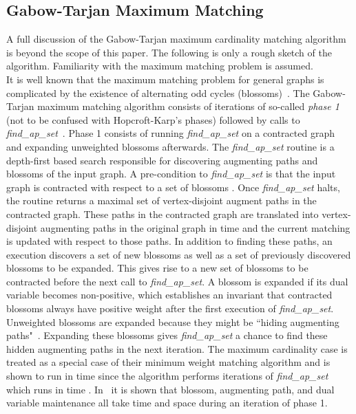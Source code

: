 \documentclass{llncs}
\begin{document}
\subsection{Gabow-Tarjan Maximum Matching}

A full discussion of the Gabow-Tarjan maximum cardinality matching algorithm~\cite{GabowT91} is beyond the scope of this paper.  The following is only a rough sketch of the algorithm.  Familiarity with the maximum matching problem is assumed.\\

\noindent It is well known that the maximum matching problem for general graphs is complicated by the existence of alternating odd cycles (blossoms)~\cite{Edmonds65}.  
The Gabow-Tarjan maximum matching algorithm consists of  iterations of so-called \emph{phase 1} (not to be confused with Hopcroft-Karp's phases) followed by  calls to \emph{find\_ap\_set}~\cite{GabowT91}.  
Phase 1 consists of running \emph{find\_ap\_set} on a contracted graph  and expanding unweighted blossoms afterwards. 
The \emph{find\_ap\_set} routine is a depth-first based search responsible for discovering augmenting paths and blossoms of the input graph. A pre-condition to \emph{find\_ap\_set} is that the input graph  is contracted with respect to a set of blossoms .  Once \emph{find\_ap\_set} halts, the routine returns a maximal set of vertex-disjoint augment paths in the contracted graph.  These paths in the contracted graph are translated into vertex-disjoint augmenting paths in the original graph in  time and the current matching is updated with respect to those paths.  In addition to finding these paths, an execution discovers a set of new blossoms as well as a set of previously discovered blossoms to be expanded. This gives rise to a new set of blossoms to be contracted before the next call to \emph{find\_ap\_set}.  A blossom is expanded if its dual variable  becomes non-positive, which establishes an invariant that contracted blossoms  always have positive weight after the first execution of \emph{find\_ap\_set}.  Unweighted blossoms are expanded because they might be ``hiding augmenting paths"~\cite{Edmonds65}.  Expanding these blossoms gives \emph{find\_ap\_set} a chance to find these hidden augmenting paths in the next iteration. The maximum cardinality case is treated as a special case of their minimum weight matching algorithm and is shown to run in time  since the algorithm performs  iterations of \emph{find\_ap\_set} which runs in time . 
In~\cite{GabowT91} it is shown that blossom, augmenting path, and dual variable maintenance all take  time and space during an iteration of phase 1.  
\end{document}

